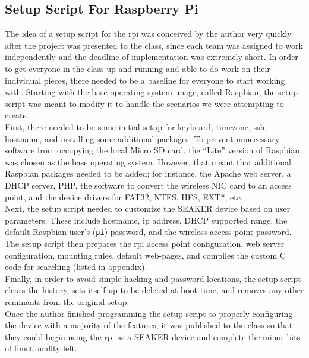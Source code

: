 \documentclass[12pt]{article}
\begin{document}
\subsection{Setup Script For Raspberry Pi}

The idea of a setup script for the \gls{rpi} was conceived by the author 
very quickly after the project was presented to the class, since
each team was assigned to work independently and the deadline of implementation was
extremely short.  In order to get everyone in
the class up and running and able to do work on their individual pieces, there
needed to be a baseline for everyone to start working with.  Starting with the 
base operating system image, called Raspbian, the setup script was meant to modify
it to handle the scenarios we were attempting to create.\\

First, there needed to be some initial setup for keyboard, timezone, \gls{ssh}, hostname,
and installing some additional packages.  To prevent unnecessary 
software from occupying the local Micro SD card, the ``Lite'' version of Raspbian
was chosen as the base operating system.  However, that meant that additional
Raspbian packages needed to be added; for instance, the Apache web server, a DHCP
server, PHP, the software to convert the wireless NIC card to an access point, and
the device drivers for FAT32, NTFS, HFS, EXT*, etc.\\

Next, the setup script needed to customize the SEAKER device based on user
parameters.  These include hostname, \gls{ip} address, DHCP supported range, the
default Raspbian user's (\verb|pi|) password, and the wireless access point password.\\

The setup script then prepares the \gls{rpi} access point configuration, web server
configuration, mounting rules, default web-pages, and compiles the custom C code
for searching (listed in appendix).\\

Finally, in order to avoid simple hacking and password locations, the setup
script clears the history, sets itself up to be deleted at boot time, and removes
any other reminants from the original setup.\\

Once the author finished programming the setup script to properly configuring the
device with a majority of the features, it was published to the class so that they could
begin using the \gls{rpi} as a SEAKER device and complete the minor bits of
functionality left.\\
\end{document}
